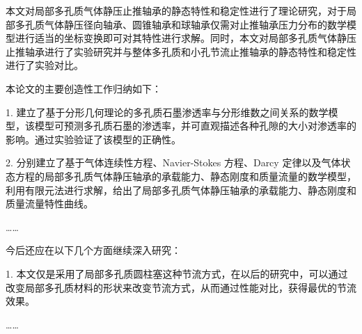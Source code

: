 \begin{conclusions}
本文对局部多孔质气体静压止推轴承的静态特性和稳定性进行了理论研究，对于局部多孔质气体静压径向轴承、圆锥轴承和球轴承仅需对止推轴承压力分布的数学模型进行适当的坐标变换即可对其特性进行求解。同时，本文对局部多孔质气体静压止推轴承进行了实验研究并与整体多孔质和小孔节流止推轴承的静态特性和稳定性进行了实验对比。 

本论文的主要创造性工作归纳如下：

1. 建立了基于分形几何理论的多孔质石墨渗透率与分形维数之间关系的数学模型，该模型可预测多孔质石墨的渗透率，并可直观描述各种孔隙的大小对渗透率的影响。通过实验验证了该模型的正确性。

2. 分别建立了基于气体连续性方程、Navier-Stokes 方程、Darcy 定律以及气体状态方程的局部多孔质气体静压轴承的承载能力、静态刚度和质量流量的数学模型，利用有限元法进行求解，给出了局部多孔质气体静压轴承的承载能力、静态刚度和质量流量特性曲线。

……

今后还应在以下几个方面继续深入研究：

1. 本文仅是采用了局部多孔质圆柱塞这种节流方式，在以后的研究中，可以通过改变局部多孔质材料的形状来改变节流方式，从而通过性能对比，获得最优的节流效果。

……  

\end{conclusions}
